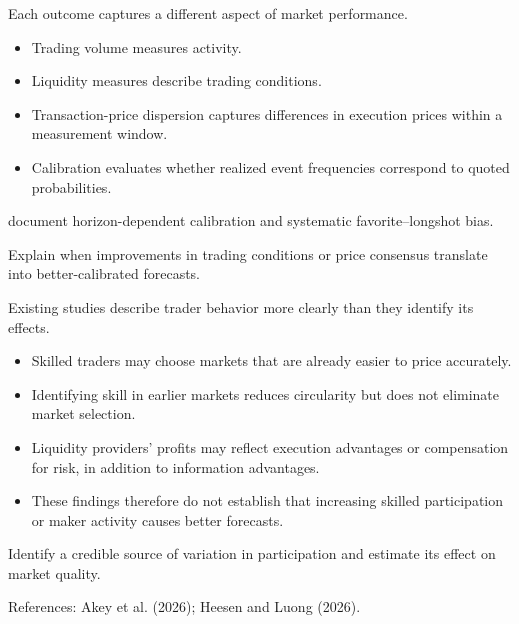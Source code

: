\begin{frame}[t]
\par{}
\begin{pmbody}
{\color{pmGrey}\fontsize{20}{27}\selectfont Each outcome captures a different aspect of market performance.\par}
\begin{itemize}\pmspreaditems
  \item Trading volume measures activity.
  \item Liquidity measures describe trading conditions.
  \item Transaction-price dispersion captures differences in execution prices within a measurement window.
  \item Calibration evaluates whether realized event frequencies correspond to quoted probabilities.
\end{itemize}
\begin{pmcallout}
  document horizon-dependent calibration and systematic favorite--longshot bias.
\end{pmcallout}
\begin{pmcallout}
  Explain when improvements in trading conditions or price consensus translate into better-calibrated forecasts.
\end{pmcallout}
\end{pmbody}
\end{frame}

\begin{frame}[t]
\par{}
\begin{pmbody}
{\color{pmGrey}\fontsize{20}{27}\selectfont Existing studies describe trader behavior more clearly than they identify its effects.\par}
\begin{itemize}\pmspreaditems
  \item Skilled traders may choose markets that are already easier to price accurately.
  \item Identifying skill in earlier markets reduces circularity but does not eliminate market selection.
  \item Liquidity providers' profits may reflect execution advantages or compensation for risk, in addition to information advantages.
  \item These findings therefore do not establish that increasing skilled participation or maker activity causes better forecasts.
\end{itemize}
\begin{pmcallout}
  Identify a credible source of variation in participation and estimate its effect on market quality.
\end{pmcallout}
{\color{pmGrey}\fontsize{11}{14}\selectfont References: Akey et al. (2026); Heesen and Luong (2026).\par}
\end{pmbody}
\end{frame}
